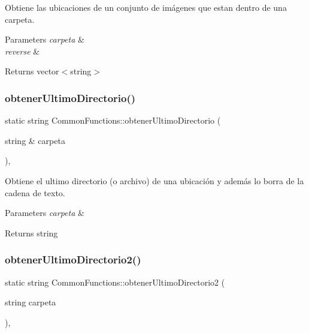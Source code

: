 Obtiene las ubicaciones de un conjunto de imágenes que estan dentro de una carpeta. 


\begin{DoxyParams}{Parameters}
{\em carpeta} & \\
\hline
{\em reverse} & \\
\hline
\end{DoxyParams}
\begin{DoxyReturn}{Returns}
vector$<$string$>$ 
\end{DoxyReturn}
\mbox{\label{classCommonFunctions_a9b3747c4d4a2bc6d897ba1ae2ec59f00}} 
\subsubsection{\texorpdfstring{obtener\+Ultimo\+Directorio()}{obtenerUltimoDirectorio()}}
{\footnotesize\ttfamily static string Common\+Functions\+::obtener\+Ultimo\+Directorio (\begin{DoxyParamCaption}\item[{string \&}]{carpeta }\end{DoxyParamCaption})\hspace{0.3cm}{\ttfamily [inline]}, {\ttfamily [static]}}



Obtiene el ultimo directorio (o archivo) de una ubicación y además lo borra de la cadena de texto. 


\begin{DoxyParams}{Parameters}
{\em carpeta} & \\
\hline
\end{DoxyParams}
\begin{DoxyReturn}{Returns}
string 
\end{DoxyReturn}
\mbox{\label{classCommonFunctions_af27fbe7fc5de24747ddf5a0496016301}} 
\subsubsection{\texorpdfstring{obtener\+Ultimo\+Directorio2()}{obtenerUltimoDirectorio2()}}
{\footnotesize\ttfamily static string Common\+Functions\+::obtener\+Ultimo\+Directorio2 (\begin{DoxyParamCaption}\item[{string}]{carpeta }\end{DoxyParamCaption})\hspace{0.3cm}{\ttfamily [inline]}, {\ttfamily [static]}}



